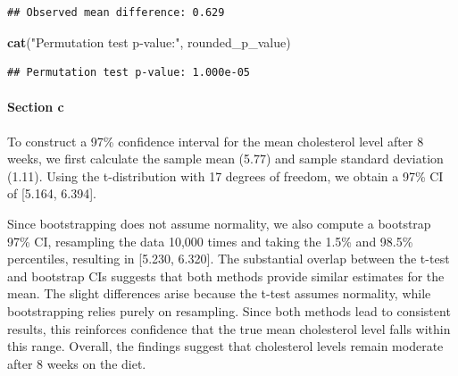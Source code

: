 \documentclass[
  11pt,
]{article}
\newenvironment{Shaded}{\begin{snugshade}}{\end{snugshade}}
\newcommand{\FunctionTok}[1]{\textcolor[rgb]{0.13,0.29,0.53}{\textbf{#1}}}
\newcommand{\NormalTok}[1]{#1}
\newcommand{\StringTok}[1]{\textcolor[rgb]{0.31,0.60,0.02}{#1}}
\begin{document}
\begin{verbatim}
## Observed mean difference: 0.629
\end{verbatim}

\begin{Shaded}
\begin{Highlighting}[]
\FunctionTok{cat}\NormalTok{(}\StringTok{"Permutation test p{-}value:"}\NormalTok{, rounded\_p\_value)}
\end{Highlighting}
\end{Shaded}

\begin{verbatim}
## Permutation test p-value: 1.000e-05
\end{verbatim}

\paragraph{Section c}\label{section-c}

To construct a 97\% confidence interval for the mean cholesterol level
after 8 weeks, we first calculate the sample mean (5.77) and sample
standard deviation (1.11). Using the t-distribution with 17 degrees of
freedom, we obtain a 97\% CI of {[}5.164, 6.394{]}.

Since bootstrapping does not assume normality, we also compute a
bootstrap 97\% CI, resampling the data 10,000 times and taking the 1.5\%
and 98.5\% percentiles, resulting in {[}5.230, 6.320{]}. The substantial
overlap between the t-test and bootstrap CIs suggests that both methods
provide similar estimates for the mean. The slight differences arise
because the t-test assumes normality, while bootstrapping relies purely
on resampling. Since both methods lead to consistent results, this
reinforces confidence that the true mean cholesterol level falls within
this range. Overall, the findings suggest that cholesterol levels remain
moderate after 8 weeks on the diet.
\end{document}
